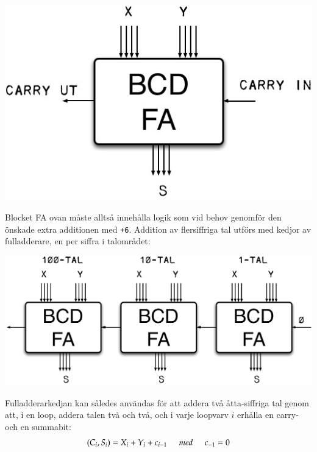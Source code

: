 \documentclass[oneside,10pt,a4paper,swedish]{scrbook}
\newcommand{\asm}[1]{\texttt{#1}}
\begin{document}
\begin{center}
\includegraphics[scale = 0.3]{bcdfa.jpg}
\end{center}

Blocket FA ovan måste alltså innehålla logik som vid behov genomför den önskade extra additionen med \asm{+6}. Addition av flersiffriga tal utförs  med kedjor av fulladderare, en per siffra i talområdet:

\begin{center}
\includegraphics[scale = 0.3]{bcdfas.pdf}
\end{center}


Fulladderarkedjan kan således användas för att addera två åtta-siffriga tal genom att, i en loop, addera talen två och två, och i varje loopvarv $i$ erhålla en carry- och en summabit: \[(C_i,S_i) = X_i + Y_i + c_{i-1} \hspace{5mm}med\hspace{5mm} c_{-1}=0\]
\end{document}
